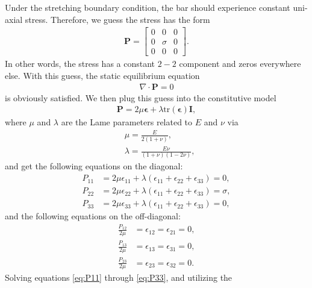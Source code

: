 \documentclass[a4paper]{article}
\newcommand{\mb}[1]{{\mathbf{#1}}}
\newcommand{\II}{\mb{I}}
\newcommand{\PP}{\mb{P}}
\newcommand{\eepsilon}{\boldsymbol{\epsilon}}
\begin{document}
Under the stretching boundary condition, the bar should experience constant
uni-axial stress. Therefore, we guess the stress has the form
\begin{align*}
	\PP
	=
	\begin{bmatrix}
		0 & 0 & 0 \\
		0 & \sigma & 0 \\
		0 & 0 & 0
	\end{bmatrix}.
\end{align*}
In other words, the stress has a constant $2-2$ component and zeros everywhere
else.
With this guess, the static equilibrium equation
\begin{align*}
	\nabla \cdot \PP = 0
\end{align*}
is obviously satisfied.
We then plug this guess into the constitutive model
\begin{align*}
	\PP = 2\mu \eepsilon + \lambda \text{tr}(\eepsilon) \II,
\end{align*}
where $\mu$ and $\lambda$ are the Lame parameters related to $E$ and $\nu$ via
\begin{align}
	 & \mu = \frac{E}{2(1+\nu)},\label{eq:lame1}               \\
	 & \lambda = \frac{E\nu}{(1+\nu)(1-2\nu)}\label{eq:lame2},
\end{align}
and get the following equations on the diagonal:
\begin{align}
	P_{11} & = 2\mu\epsilon_{11} + \lambda(\epsilon_{11} + \epsilon_{22} +
	\epsilon_{33}) = 0 \label{eq:P11},                                     \\
	P_{22} & = 2\mu\epsilon_{22} + \lambda(\epsilon_{11} + \epsilon_{22} +
	\epsilon_{33}) = \sigma \label{eq:P22},                                \\
	P_{33} & = 2\mu\epsilon_{33} + \lambda(\epsilon_{11} + \epsilon_{22} +
	\epsilon_{33}) = 0\label{eq:P33},
\end{align}
and the following equations on the off-diagonal:
\begin{align}
	\frac{P_{12}}{2\mu} & = \epsilon_{12} = \epsilon_{21} = 0,
	\label{eq:P12}                                             \\
	\frac{P_{13}}{2\mu} & = \epsilon_{13} = \epsilon_{31} = 0,
	\label{eq:P13}                                             \\
	\frac{P_{23}}{2\mu} & = \epsilon_{23} = \epsilon_{32} = 0.
	\label{eq:P23}
\end{align}
Solving equations \eqref{eq:P11} through \eqref{eq:P33}, and utilizing the
\end{document}
